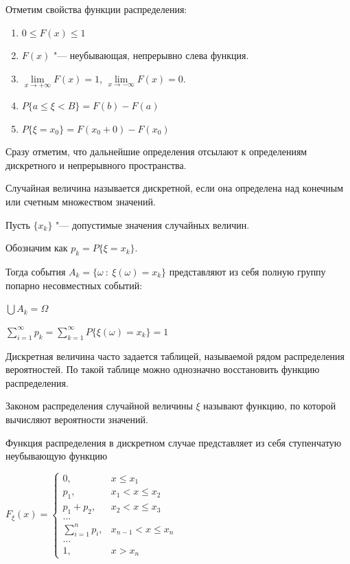 Отметим свойства функции распределения:
\begin{enumerate}
    \item $0 \leq F(x) \leq 1$
    \item $F(x)$ "--- неубывающая, непрерывно слева функция.
    \item $\lim\limits_{x \rightarrow +\infty} F(x) = 1$, $\lim\limits_{x\rightarrow -\infty}F(x) = 0$.
    \item $P\{a \leq \xi < B\} = F(b) - F(a)$
    \item $P\{\xi = x_0\} = F(x_0 + 0) - F(x_0)$
\end{enumerate}
Сразу отметим, что дальнейшие определения отсылают
к определениям дискретного и непрерывного пространства.
\begin{definition}
    Случайная величина называется дискретной, если
    она определена над конечным или счетным множеством значений.
    
    Пусть $\{x_k\}$ "--- допустимые значения случайных величин.
    
    Обозначим как $p_k = P\{\xi = x_k\}$.

    Тогда события $A_k = \{\omega ~:~ \xi(\omega) = x_k\}$ представляют
    из себя полную группу попарно несовместных событий:

    $\bigcup A_k = \Omega$

    $\sum\limits_{i = 1}^\infty p_k = \sum\limits_{k = 1}^\infty P\{ \xi(\omega) = x_k\} = 1$
\end{definition}

Дискретная величина часто задается таблицей, называемой рядом распределения вероятностей.
По такой таблице можно однозначно восстановить функцию распределения.
\begin{definition}
    Законом распределения случайной величины $\xi$ называют
    функцию, по которой вычисляют вероятности значений.
\end{definition}

Функция распределения в дискретном случае представляет из себя
ступенчатую неубывающую функцию 

$F_\xi(x) = \begin{cases}
    0, & x \leq x_1 \\
    p_1, & x_1 < x \leq x_2 \\
    p_1 + p_2, & x_2 < x \leq x_3 \\
    \dots \\
    \sum\limits_{i = 1}^n p_i, & x_{n - 1} < x \leq x_n \\
    \dots \\
    1, & x > x_n
\end{cases}$


